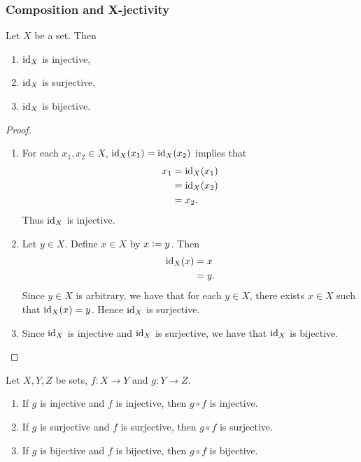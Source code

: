 \documentclass{book}
\begin{document}
	
	
	
	
	
	
	
	
	\subsubsection{Composition and X-jectivity}
	
	\begin{ex}
		Let $X$ be a set. Then
		\begin{enumerate}
			\item $\operatorname{id}_X$ is injective,
			\item $\operatorname{id}_X$ is surjective,
			\item $\operatorname{id}_X$ is bijective.
		\end{enumerate}
	\end{ex}
	
	\begin{proof}\
		\begin{enumerate}
			\item For each $x_1, x_2 \in X$, $\operatorname{id}_X(x_1) = \operatorname{id}_X(x_2)$ implies that 
			\begin{align*}
				x_1
				& = \operatorname{id}_X(x_1) \\
				& = \operatorname{id}_X(x_2) \\
				& = x_2. 
			\end{align*}
			Thus $\operatorname{id}_X$ is injective.
			\item Let $y \in X$. Define $x \in X$ by $x \vcentcolon= y$. Then 
			\begin{align*}
				\operatorname{id}_X(x)
				& = x \\
				& = y.
			\end{align*}
			Since $y \in X$ is arbitrary, we have that for each $y \in X$, there exists $x \in X$ such that $\operatorname{id}_X(x) = y$. Hence $\operatorname{id}_X$ is surjective.
			\item Since $\operatorname{id}_X$ is injective and $\operatorname{id}_X$ is surjective, we have that $\operatorname{id}_X$ is bijective.
		\end{enumerate}
	\end{proof}
	
	\begin{ex}
		Let $X,Y,Z$ be sets, $f:X \rightarrow Y$ and $g:Y \rightarrow Z$. 
		\begin{enumerate}
			\item If $g$ is injective and $f$ is injective, then $g \circ f$ is injective.
			\item If $g$ is surjective and $f$ is surjective, then $g \circ f$ is surjective.
			\item If $g$ is bijective and $f$ is bijective, then $g \circ f$ is bijective.
		\end{enumerate}
	\end{ex}
	
\end{document}
